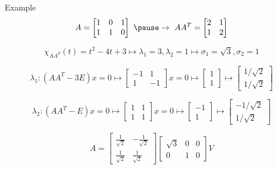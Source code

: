 \documentclass[fullscreen=true, bookmarks=true, hyperref={pdfencoding=unicode}]{beamer}
\begin{document}
\begin{frame}{Example}
  $$A = \begin{bmatrix}
    1 & 0 & 1 \\
    1 & 1 & 0
  \end{bmatrix}\ \pause\to\ AA^T = \begin{bmatrix}
    2 & 1 \\
    1 & 2
  \end{bmatrix}$$

  \pause$$\chi_{AA^T}(t) = t^2 -4t+3 \mapsto \lambda_1 = 3, \lambda_2 = 1 
  \mapsto \sigma_1 = \sqrt{3}, \sigma_2 = 1$$

  \pause$$\lambda_1: (AA^T - 3E) x = 0 \mapsto \begin{bmatrix}
    -1 & 1 \\
     1 & -1
  \end{bmatrix}x=0 \mapsto \begin{bmatrix}
    1 \\ 1
  \end{bmatrix} \mapsto \begin{bmatrix}
    1/\sqrt{2} \\ 1/\sqrt{2}
  \end{bmatrix}$$

  \pause$$\lambda_2: (AA^T - E) x = 0 \mapsto \begin{bmatrix}
    1 & 1 \\
    1 & 1
  \end{bmatrix}x=0 \mapsto \begin{bmatrix}
    -1 \\ 1
  \end{bmatrix} \mapsto \begin{bmatrix}
    -1/\sqrt{2} \\ 1/\sqrt{2}
  \end{bmatrix}$$

  \pause$$ A = \begin{bmatrix}
    \frac{1}{\sqrt{2}} & -\frac{1}{\sqrt{2}} \\ 
    \frac{1}{\sqrt{2}} & \frac{1}{\sqrt{2}}
  \end{bmatrix} 
  \begin{bmatrix}
    \sqrt{3} & 0 & 0 \\
      0 & 1 & 0
  \end{bmatrix} V
  $$
\end{frame}
\end{document}
